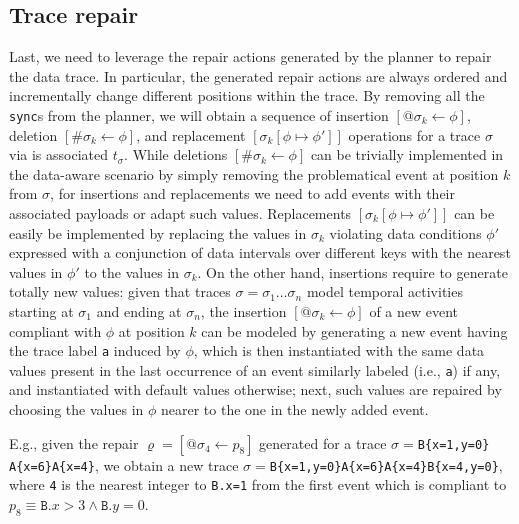 \subsection{Trace repair}\label{ssec:trerepair}
Last, we need to leverage the repair actions generated by the planner to repair the data trace. In particular, the generated repair actions are always ordered and incrementally change different positions within the trace. By removing all the \texttt{sync}s from the planner, we will obtain a sequence of insertion $[@\sigma_k\leftarrow \phi]$, deletion $[\#\sigma_k\leftarrow \phi]$, and replacement $[\sigma_k[\phi\mapsto \phi']]$ operations for a trace $\sigma$ via is associated $t_\sigma$. While deletions $[\#\sigma_k\leftarrow \phi]$ can be trivially implemented in the data-aware scenario by simply removing the problematical event at position $k$ from $\sigma$, for insertions and replacements we need to add events with their associated payloads or adapt such values. Replacements $[\sigma_k[\phi\mapsto \phi']]$ can be easily be implemented by replacing the values in $\sigma_k$ violating data conditions $\phi'$ expressed with a conjunction of data intervals over different keys with the nearest values in $\phi'$ to the values in $\sigma_k$. On the other hand, insertions require to generate totally new values: given that traces $\sigma=\sigma_1\dots \sigma_n$ model temporal activities starting at $\sigma_1$ and ending at $\sigma_n$,  the insertion $[@\sigma_k\leftarrow \phi]$ of a new event compliant with $\phi$ at position $k$ can be modeled by generating a new event having the trace label \texttt{a} induced by $\phi$, which is then instantiated with the same data values present in the last occurrence of an event similarly labeled (i.e., \texttt{a}) if any, and instantiated with default values otherwise; next, such values are repaired by choosing the values in $\phi$ nearer to the one in the newly added event.

E.g., given the repair $\varrho=[@\sigma_4\leftarrow p_8]$ generated for a trace $\sigma=$\texttt{B\{x=1,y=0\}\\A\{x=6\}A\{x=4\}}, we obtain a new trace $\sigma=$\texttt{B\{x=1,y=0\}$  $A\{x=6\}A\{x=4\}B\{x=4,y=0\}}, where \texttt{4} is the nearest integer to \texttt{B.x=1} from the first event which is compliant to $p_8\equiv\texttt{B}.x>3\wedge \texttt{B}.y=0$.